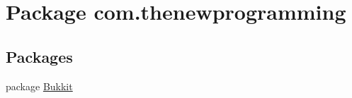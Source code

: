 \hypertarget{namespacecom_1_1thenewprogramming}{\section{Package com.\-thenewprogramming}
\label{namespacecom_1_1thenewprogramming}
}
\subsection*{Packages}
\begin{DoxyCompactItemize}
\item 
package \hyperlink{namespacecom_1_1thenewprogramming_1_1_bukkit}{Bukkit}
\end{DoxyCompactItemize}
